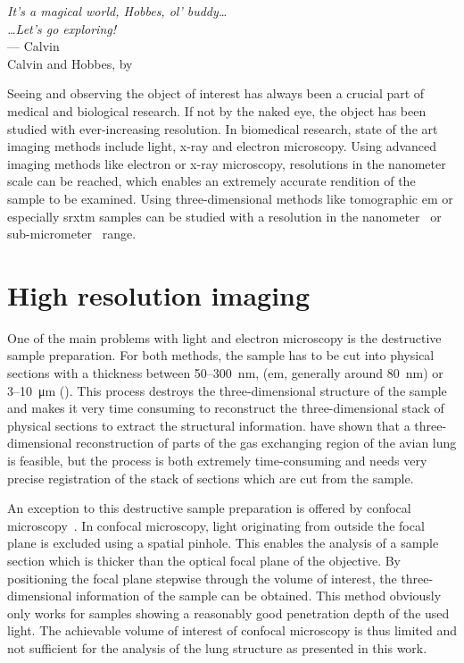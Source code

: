 \acresetall
{}\label{ch:introduction}
\begin{flushright}{\slshape
		It's a magical world, Hobbes, ol' buddy\ldots\\
		\ldots Let's go exploring!}\\ \medskip
		--- Calvin\\Calvin and Hobbes, by \citep{Watterson1996}
\end{flushright}
\vspace{6cm}
Seeing and observing the object of interest has always been a crucial part of medical and biological research. If not by the naked eye, the object has been studied with ever-increasing resolution. In biomedical research, state of the art imaging methods include light, x-ray and electron microscopy. Using advanced imaging methods like electron or x-ray microscopy, resolutions in the nanometer scale can be reached, which enables an extremely accurate rendition of the sample to be examined. Using three-dimensional methods like tomographic \ac{em} or especially \ac{srxtm} samples can be studied with a resolution in the nanometer~\cite{Downing2007} or sub-micrometer~\cite{Stampanoni2010} range.

\section{High resolution imaging}\label{sec:high resolution imaging}
One of the main problems with light and electron microscopy is the destructive sample preparation. For both methods, the sample has to be cut into physical sections with a thickness between 50--\SI{300}{\nano\meter}, (\acs{em}, generally around \SI{80}{\nano\meter}) or 3--\SI{10}{\micro\meter} (). This process destroys the three-dimensional structure of the sample and makes it very time consuming to reconstruct the three-dimensional stack of physical sections to extract the structural information. \citet{Woodward2005} have shown that a three-dimensional reconstruction of parts of the gas exchanging region of the avian lung is feasible, but the process is both extremely time-consuming and needs very precise registration of the stack of sections which are cut from the sample.

An exception to this destructive sample preparation is offered by confocal microscopy~\cite{Minsky1961}. In confocal microscopy, light originating from outside the focal plane is excluded using a spatial pinhole. This enables the analysis of a sample section which is thicker than the optical focal plane of the objective. By positioning the focal plane stepwise through the volume of interest, the three-dimensional information of the sample can be obtained. This method obviously only works for samples showing a reasonably good penetration depth of the used light. The achievable volume of interest of confocal microscopy is thus limited and not sufficient for the analysis of the lung structure as presented in this work. 

